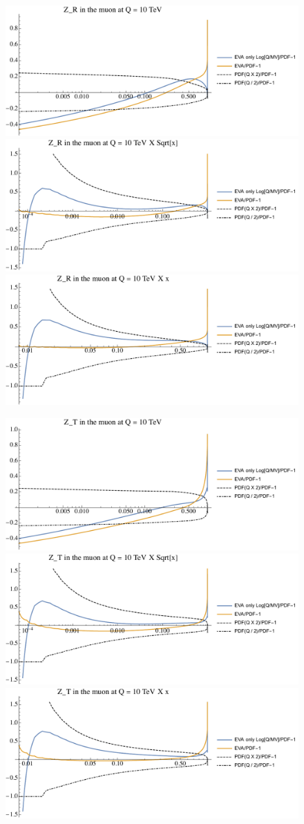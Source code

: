 \documentclass[a4paper,11pt]{article}
\begin{document}
\begin{figure}[ht]
\includegraphics[width=0.46\linewidth]{PlotPDFs/ratios/10TeV/Z_R_Q.pdf}
\includegraphics[width=0.46\linewidth]{PlotPDFs/ratios/10TeV/Z_R_Qsqrtx.pdf}
\includegraphics[width=0.46\linewidth]{PlotPDFs/ratios/10TeV/Z_R_Qx.pdf}
\end{figure}

\begin{figure}[ht]
\includegraphics[width=0.46\linewidth]{PlotPDFs/ratios/10TeV/Z_T_Q.pdf}
\includegraphics[width=0.46\linewidth]{PlotPDFs/ratios/10TeV/Z_T_Qsqrtx.pdf}
\includegraphics[width=0.46\linewidth]{PlotPDFs/ratios/10TeV/Z_T_Qx.pdf}
\end{figure}
\end{document}
